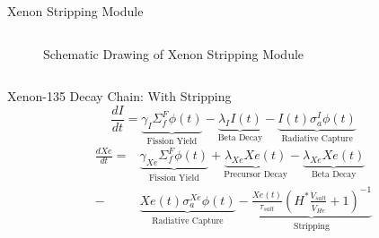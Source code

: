 \documentclass[aspectratio=1610,pdftex,dvipsnames]{beamer}
\begin{document}
\begin{frame}{Xenon Stripping Module}
    \begin{columns}[T]
    \begin{column}{0.5\textwidth}
    \begin{figure}[h!]\centering
    \caption{Schematic Drawing of Xenon Stripping Module} \label{strip}
    \end{figure}\end{column}
    \begin{column}{0.5\textwidth}


    \end{column}\end{columns}
\end{frame}

\begin{frame}{Xenon-135 Decay Chain: With Stripping}
    \begin{equation*}\label{diffI}
        \frac{dI}{dt} =
        \underbrace{\gamma_{I}\Sigma_{f}^{F}{\phi}(t)}_{\text{Fission Yield}}
        -\underbrace{\lambda_{I}I(t)}_{\text{Beta Decay}}
        -\underbrace{I(t)\sigma_{a}^{I}{\phi}(t)}_{\text{Radiative Capture}}
    \end{equation*}
    \begin{equation*}\label{diffXe_strip}
        \begin{split}
        \frac{dXe}{dt} =
        &\underbrace{\gamma_{Xe}\Sigma_{f}^{F}{\phi}(t)}_{\text{Fission Yield}}
        +\underbrace{\lambda_{Xe}Xe(t)}_{\text{Precursor Decay}}
        -\underbrace{\lambda_{Xe}Xe(t)}_{\text{Beta Decay}}\\
        -&\underbrace{Xe(t)\sigma_{a}^{Xe}{\phi}(t)}_{\text{Radiative Capture}}
        -\underbrace{ \frac{Xe(t)}{\tau_{salt}}\left( H^*\frac{\dot{V}_{salt}}{\dot{V}_{He}}+1 \right)^{-1}}_{\text{Stripping}}
        \end{split}
    \end{equation*}
\end{frame}
\end{document}

